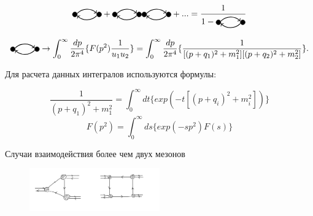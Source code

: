 \documentclass{article}
\begin{document}
\begin{equation}
    \tikz[baseline=-0.5ex]{
    \filldraw (0, 0) circle (0.1cm);
    \filldraw (1, 0) circle (0.1cm);
    \draw[->, thick] (0.1, 0.05) to[out=45, in=135] (0.9, 0.05);
    \draw[<-, thick] (0.1, -0.05) to[out=-45, in=-135] (0.9, -0.05);
} + \tikz[baseline=-0.5ex]{
    \filldraw (0, 0) circle (0.1cm);
    \filldraw (1, 0) circle (0.1cm);
    \draw[->, thick] (0.1, 0.05) to[out=45, in=135] (0.9, 0.05);
    \draw[<-, thick] (0.1, -0.05) to[out=-45, in=-135] (0.9, -0.05);
}\tikz[baseline=-0.5ex]{
    \filldraw (0, 0) circle (0.1cm);
    \filldraw (1, 0) circle (0.1cm);
    \draw[->, thick] (0.1, 0.05) to[out=45, in=135] (0.9, 0.05);
    \draw[<-, thick] (0.1, -0.05) to[out=-45, in=-135] (0.9, -0.05);
} + ... = \frac{1}{1 - \tikz[baseline=-0.5ex]{
    \filldraw (0, 0) circle (0.1cm);
    \filldraw (1, 0) circle (0.1cm);
    \draw[->, thick] (0.1, 0.05) to[out=45, in=135] (0.9, 0.05);
    \draw[<-, thick] (0.1, -0.05) to[out=-45, in=-135] (0.9, -0.05);
}} 
\end{equation}

\begin{equation}
    \tikz[baseline=-0.5ex]{
    \filldraw (0, 0) circle (0.1cm);
    \filldraw (1, 0) circle (0.1cm);
    \draw[->, thick] (0.1, 0.05) to[out=45, in=135] (0.9, 0.05);
    \draw[<-, thick] (0.1, -0.05) to[out=-45, in=-135] (0.9, -0.05);
} \to \int_{0}^{\infty}\frac{dp}{2\pi^4}\{F(p^2)\frac{1}{u_1u_2}\} = \int_{0}^{\infty}\frac{dp}{2\pi^4}\{\frac{1}{[(p + q_1)^2 + m_1^2][(p + q_2)^2 + m_2^2]}\}.
\end{equation}

Для расчета данных интегралов используются формулы:

\begin{equation}
    \frac{1}{(p + q_1)^2 + m_1^2} = \int_{0}^{\infty}dt\{exp(-t[(p + q_i)^2 + m_i^2])\}
\end{equation}
\begin{equation}
    F(p^2) = \int_{0}^{\infty}ds\{exp(-sp^2)F(s)\}
\end{equation}

Случаи взаимодействия более чем двух мезонов

\begin{figure}[H]
    \centering
    \includegraphics[width=0.5\textwidth]{multiple-interactions.png}
\end{figure}
\end{document}
